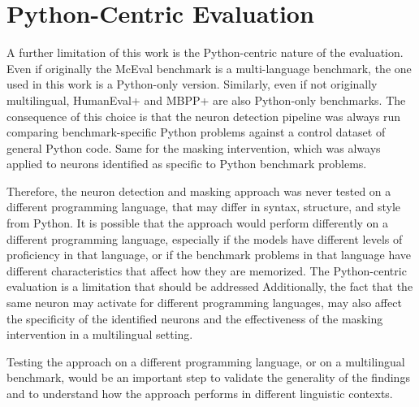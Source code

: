 \documentclass[mscthesis]{usiinfthesis}
\begin{document}
\section{Python-Centric Evaluation}
A further limitation of this work is the Python-centric nature of the evaluation.
Even if originally the McEval benchmark is a multi-language benchmark, the one used in this work is a Python-only
version.
Similarly, even if not originally multilingual, HumanEval+ and MBPP+ are also Python-only benchmarks.
The consequence of this choice is that the neuron detection pipeline was always run 
comparing benchmark-specific Python problems against a control dataset of general Python code.
Same for the masking intervention, which was always applied to neurons identified as specific to Python benchmark problems.
\par\vspace{1em}
Therefore, the neuron detection and masking approach was never tested on a different programming language, 
that may differ in syntax, structure, and style from Python.
It is possible that the approach would perform differently on a different programming language, especially if the models have different levels of proficiency in that language, or if the benchmark problems in that language have different characteristics that affect how they are memorized.
The Python-centric evaluation is a limitation that should be addressed
Additionally, the fact that the same neuron may activate for different programming languages, may also affect the specificity of the identified neurons and the effectiveness of the masking intervention in a multilingual setting.
\par\vspace{1em}
Testing the approach on a different programming language, or on a multilingual benchmark, would be an important step to validate the generality of the findings and to understand how the approach performs in different linguistic contexts.
\end{document}
